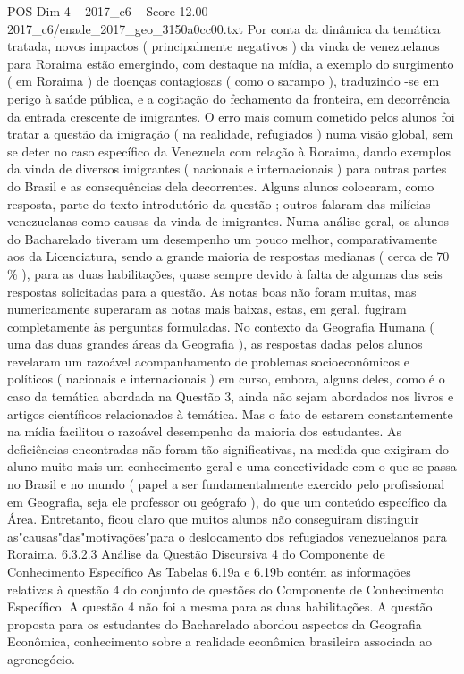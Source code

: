 \begin{textsample}{POS Dim 4 – 2017\_c6 – Score 12.00 – 2017\_c6/enade\_2017\_geo\_3150a0cc00.txt}
Por conta da dinâmica da temática tratada, novos impactos ( principalmente negativos ) da vinda de venezuelanos para Roraima estão emergindo, com destaque na mídia, a exemplo do surgimento ( em Roraima ) de doenças contagiosas ( como o sarampo ), traduzindo -se em perigo à saúde pública, e a cogitação do fechamento da fronteira, em decorrência da entrada crescente de imigrantes.
O erro mais comum cometido pelos alunos foi tratar a questão da imigração ( na realidade, refugiados ) numa visão global, sem se deter no caso específico da Venezuela com relação à Roraima, dando exemplos da vinda de diversos imigrantes ( nacionais e internacionais ) para outras partes do Brasil e as consequências dela decorrentes.
Alguns alunos colocaram, como resposta, parte do texto introdutório da questão ; outros falaram das milícias venezuelanas como causas da vinda de imigrantes.
Numa análise geral, os alunos do Bacharelado tiveram um desempenho um pouco melhor, comparativamente aos da Licenciatura, sendo a grande maioria de respostas medianas ( cerca de 70 \% ), para as duas habilitações, quase sempre devido à falta de algumas das seis respostas solicitadas para a questão.
As notas boas não foram muitas, mas numericamente superaram as notas mais baixas, estas, em geral, fugiram completamente às perguntas formuladas.
No contexto da Geografia Humana ( uma das duas grandes áreas da Geografia ), as respostas dadas pelos alunos revelaram um razoável acompanhamento de problemas socioeconômicos e políticos ( nacionais e internacionais ) em curso, embora, alguns deles, como é o caso da temática abordada na Questão 3, ainda não sejam abordados nos livros e artigos científicos relacionados à temática.
Mas o fato de estarem constantemente na mídia facilitou o razoável desempenho da maioria dos estudantes.
As deficiências encontradas não foram tão significativas, na medida que exigiram do aluno muito mais um conhecimento geral e uma conectividade com o que se passa no Brasil e no mundo ( papel a ser fundamentalmente exercido pelo profissional em Geografia, seja ele professor ou geógrafo ), do que um conteúdo específico da Área.
Entretanto, ficou claro que muitos alunos não conseguiram distinguir as"causas"das"motivações"para o deslocamento dos refugiados venezuelanos para Roraima. 6.3.2.3 Análise da Questão Discursiva 4 do Componente de Conhecimento Específico As Tabelas 6.19a e 6.19b contém as informações relativas à questão 4 do conjunto de questões do Componente de Conhecimento Específico.
A questão 4 não foi a mesma para as duas habilitações.
A questão proposta para os estudantes do Bacharelado abordou aspectos da Geografia Econômica, conhecimento sobre a realidade econômica brasileira associada ao agronegócio.

\end{textsample}
